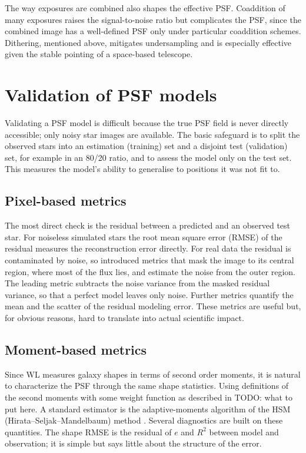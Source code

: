 \documentclass[11pt]{book}
\begin{document}
The way exposures are combined also shapes the effective PSF. Coaddition of many exposures raises the signal-to-noise ratio but complicates the PSF, since the combined image has a well-defined PSF only under particular coaddition schemes. Dithering, mentioned above, mitigates undersampling and is especially effective given the stable pointing of a space-based telescope.

\section{Validation of PSF models}
\label{sec:validation}

Validating a PSF model is difficult because the true PSF field is never directly accessible; only noisy star images are available. The basic safeguard is to split the observed stars into an estimation (training) set and a disjoint test (validation) set, for example in an 80/20 ratio, and to assess the model only on the test set. This measures the model's ability to generalise to positions it was not fit to.

\subsection{Pixel-based metrics}

The most direct check is the residual between a predicted and an observed test star. For noiseless simulated stars the root mean square error (RMSE) of the residual measures the reconstruction error directly. For real data the residual is contaminated by noise, so \cite{liaudat2021mccd} introduced metrics that mask the image to its central region, where most of the flux lies, and estimate the noise from the outer region. The leading metric subtracts the noise variance from the masked residual variance, so that a perfect model leaves only noise. Further metrics quantify the mean and the scatter of the residual modeling error. These metrics are useful but, for obvious reasons, hard to translate into actual scientific impact.

\subsection{Moment-based metrics}

Since WL measures galaxy shapes in terms of second order moments, it is natural to characterize the PSF through the same shape statistics. Using definitions of the second moments with some weight function as described in TODO: what to put here. 
A standard estimator is the adaptive-moments algorithm of the HSM (Hirata--Seljak--Mandelbaum) method \cite{hirata_seljak2003}. Several diagnostics are built on these quantities. The shape RMSE is the residual of $e$ and $R^2$ between model and observation; it is simple but says little about the structure of the error.
\end{document}
